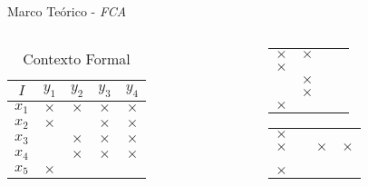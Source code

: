 \begin{frame}[c]{Marco Teórico - \emph{FCA}}
	\begin{columns}[onlytextwidth]
		\begin{column}{0.5\textwidth}
			\begin{table}[h!]
				\centering
				\begin{tabular}{|c|cccc|}
					\hline
					$I$		& $y_1$		& $y_2$ 	& $y_3$ 	& $y_4$ 	\\ \hline
					$x_1$	& $\times$	& $\times$	& $\times$ 	& $\times$ 	\\
					$x_2$	& $\times$	& 			& $\times$ 	& $\times$ 	\\
					$x_3$	& 			& $\times$	& $\times$ 	& $\times$ 	\\
					$x_4$	& 			& $\times$	& $\times$ 	& $\times$ 	\\
					$x_5$	& $\times$	& 			& 		 	& 		 	\\
					\hline
				\end{tabular}
				\label{tbl:cross_table}
				\caption{Contexto Formal}
			\end{table}
		\end{column}
		\vrule{}
		\begin{column}{0.5\textwidth}
					\begin{table}[h!]
				\centering
				\begin{tabular}{|cccc|}
					\hline
					$\times$	& $\times$  & \highlightbf{$\times$}  & \highlightbf{$\times$}    \\
					$\times$	&           & \highlightbf{$\times$}  & \highlightbf{$\times$}    \\
								& $\times$  & \highlightbf{$\times$}  & \highlightbf{$\times$}    \\
								& $\times$  & \highlightbf{$\times$}  & \highlightbf{$\times$}    \\
					$\times$	&           &                     		&                     		\\
					\hline
				\end{tabular}
				\begin{tabular}{|cccc|}
					\hline
					$\times$	& \highlightbf{$\times$}  & \highlightbf{$\times$}  & \highlightbf{$\times$}  \\
					$\times$	&                         & $\times$                & $\times$                \\
								& \highlightbf{$\times$}  & \highlightbf{$\times$}  & \highlightbf{$\times$}  \\
								& \highlightbf{$\times$}  & \highlightbf{$\times$}  & \highlightbf{$\times$}  \\
					$\times$	&                         &                         &                         \\
					\hline
				\end{tabular}
			\end{table}
		\end{column}
	\end{columns}
\end{frame}

